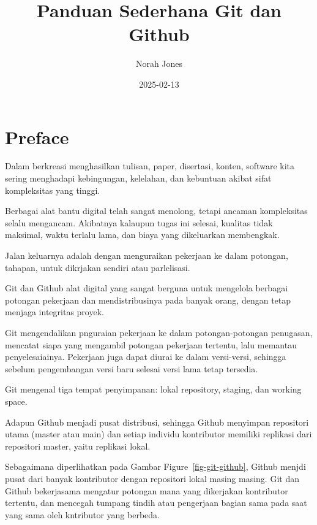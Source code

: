 \documentclass[
  letterpaper,
  DIV=11,
  numbers=noendperiod]{scrreprt}
\title{Panduan Sederhana Git dan Github}
\author{Norah Jones}
\date{2025-02-13}
\renewcommand*\contentsname{Table of contents}
\newcommand\contentsname{Table of contents}
\begin{document}
\maketitle

\renewcommand*\contentsname{Table of contents}
{
\hypersetup{linkcolor=}
\setcounter{tocdepth}{2}
\tableofcontents
}


\chapter*{Preface}\label{preface}


Dalam berkreasi menghasilkan tulisan, paper, disertasi, konten, software
kita sering menghadapi kebingungan, kelelahan, dan kebuntuan akibat
sifat kompleksitas yang tinggi.

Berbagai alat bantu digital telah sangat menolong, tetapi ancaman
kompleksitas selalu mengancam. Akibatnya kalaupun tugas ini selesai,
kualitas tidak maksimal, waktu terlalu lama, dan biaya yang dikeluarkan
membengkak.

Jalan keluarnya adalah dengan menguraikan pekerjaan ke dalam potongan,
tahapan, untuk dikrjakan sendiri atau parlelisasi.

Git dan Github alat digital yang sangat berguna untuk mengelola berbagai
potongan pekerjaan dan mendistribusinya pada banyak orang, dengan tetap
menjaga integritas proyek.

Git mengendalikan pnguraian pekerjaan ke dalam potongan-potongan
penugasan, mencatat siapa yang mengambil potongan pekerjaan tertentu,
lalu memantau penyelesaiainya. Pekerjaan juga dapat diurai ke dalam
versi-versi, sehingga sebelum pengembangan versi baru selesai versi lama
tetap tersedia.

Git mengenal tiga tempat penyimpanan: lokal repository, staging, dan
working space.

Adapun Github menjadi pusat distribusi, sehingga Github menyimpan
repositori utama (master atau main) dan setiap individu kontributor
memiliki replikasi dari repositori master, yaitu replikasi lokal.

Sebagaimana diperlihatkan pada Gambar Figure~\ref{fig-git-github},
Github menjdi pusat dari banyak kontributor dengan repositori lokal
masing masing. Git dan Github bekerjasama mengatur potongan mana yang
dikerjakan kontributor tertentu, dan mencegah tumpang tindih atau
pengerjaan bagian sama pada saat yang sama oleh kntributor yang berbeda.
\end{document}
